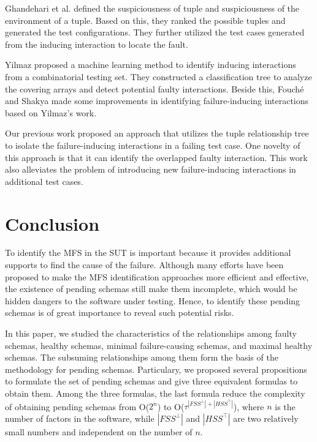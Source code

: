 {Ghandehari et al. \cite{ghandehari2012identifying} defined the suspiciousness of tuple and suspiciousness of the environment of a tuple. Based on this, they ranked the possible tuples and generated the test configurations. They \cite{ghandehari2013fault} further utilized the test cases generated from the inducing interaction to locate the fault.

Yilmaz \cite{yilmaz2006covering} proposed a machine learning method to identify inducing interactions from a combinatorial testing set. They constructed a classification tree to analyze the covering arrays and detect potential faulty interactions. Beside this, Fouch{\'e} \cite{fouche2009incremental} and Shakya \cite{shakya2012isolating} made some improvements in identifying failure-inducing interactions based on Yilmaz's work.

Our previous work \cite{niu2013identifying} proposed an approach that utilizes the tuple relationship tree to isolate the failure-inducing interactions in a failing test case. One novelty of this approach is that it can identify the overlapped faulty interaction. This work also alleviates the problem of introducing new failure-inducing interactions in additional test cases.



\section{Conclusion}\label{sec:conclusion}
To identify the MFS in the SUT is important because it provides additional supports to find the cause of the failure. Although many efforts have been proposed to make the MFS identification approaches more efficient and effective, the existence of pending schemas still make them incomplete, which would be hidden dangers to the software under testing. Hence, to identify these pending schemas is of great importance to reveal such potential risks.

In this paper, we studied the characteristics of the relationships among faulty schemas, healthy schemas, minimal failure-causing schemas, and maximal healthy schemas. The subsuming relationships among them form the basis of the methodology for pending schemas. Particulary, we proposed several propositions to formulate the set of pending schemas and give three equivalent formulas to obtain them. Among the three formulas, the last formula reduce the complexity of obtaining pending schemas from O($2^{n}$) to O($ \tau^{|FSS^{\bot}|+|HSS^{\top}|}$), where $n$ is the number of factors in the software, while $|FSS^{\bot}|$ and $|HSS^{\top}|$ are two relatively small numbers and independent on the number of $n$.

}
